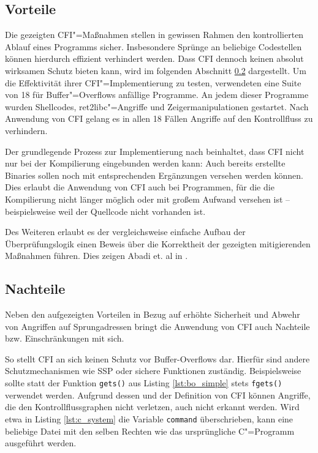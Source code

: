 \subsection{Vorteile}

Die gezeigten CFI"=Maßnahmen stellen in gewissen Rahmen den kontrollierten Ablauf eines Programms sicher. Insbesondere Sprünge an beliebige Codestellen können hierdurch effizient verhindert werden. Dass CFI dennoch keinen absolut wirksamen Schutz bieten kann, wird im folgenden Abschnitt \ref{sec:disadv} dargestellt.
Um die Effektivität ihrer CFI"=Implementierung zu testen, verwendeten \cite{Abadi.2009} eine Suite von 18 für Buffer"=Overflows anfällige Programme. An jedem dieser Programme wurden Shellcodes, ret2libc"=Angriffe und Zeigermanipulationen gestartet. Nach Anwendung von CFI gelang es in allen 18 Fällen Angriffe auf den Kontrollfluss zu verhindern.

Der grundlegende Prozess zur Implementierung nach \cite{Abadi.2009} beinhaltet, dass CFI nicht nur bei der Kompilierung eingebunden werden kann: Auch bereits erstellte Binaries sollen noch mit entsprechenden Ergänzungen versehen werden können. Dies erlaubt die Anwendung von CFI auch bei Programmen, für die die Kompilierung nicht länger möglich oder mit großem Aufwand versehen ist -- beispielsweise weil der Quellcode nicht vorhanden ist.

Des Weiteren erlaubt es der vergleichsweise einfache Aufbau der Überprüfungslogik einen Beweis über die Korrektheit der gezeigten mitigierenden Maßnahmen führen. Dies zeigen Abadi et. al in \cite{Abadi.2009}.


\subsection{Nachteile}
\label{sec:disadv}
Neben den aufgezeigten Vorteilen in Bezug auf erhöhte Sicherheit und Abwehr von Angriffen auf Sprungadressen bringt die Anwendung von CFI auch Nachteile bzw. Einschränkungen mit sich.

So stellt CFI an sich keinen Schutz vor Buffer-Overflows dar. Hierfür sind andere Schutzmechanismen wie SSP oder sichere Funktionen zuständig. Beispielsweise sollte statt der Funktion \texttt{gets()} aus Listing \ref{lst:bo_simple} stets \texttt{fgets()} verwendet werden. Aufgrund dessen und der Definition von CFI können Angriffe, die den Kontrollflussgraphen nicht verletzen, auch nicht erkannt werden. Wird etwa in Listing \ref{lst:c_system} die Variable \texttt{command} überschrieben, kann eine beliebige Datei mit den selben Rechten wie das ursprüngliche C"=Programm ausgeführt werden.

